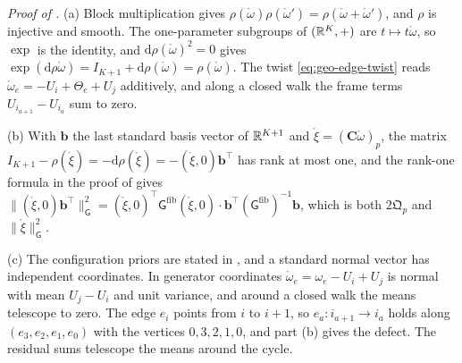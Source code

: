 \noindent\emph{Proof of .}
(a) Block multiplication gives $\rho(\mathring\omega)\rho(\mathring\omega')=\rho(\mathring\omega+\mathring\omega')$,
and $\rho$ is injective and smooth. The one-parameter subgroups of $(\mathbb R^K,+)$ are
$t\mapsto t\mathring\omega$, so $\exp$ is the identity, and $\mathrm d\rho(\mathring\omega)^2=0$ gives
$\exp(\mathrm d\rho\mathring\omega)=I_{K+1}+\mathrm d\rho(\mathring\omega)=\rho(\mathring\omega)$. The
twist \cref{eq:geo-edge-twist} reads $\mathring\omega_e=-U_i+\Theta_e+U_j$ additively, and along a closed
walk the frame terms $U_{i_{a+1}}-U_{i_a}$ sum to zero.

(b) With $\mathbf b$ the last standard basis vector of $\mathbb R^{K+1}$ and $\mathring\xi=(\mathbf C\mathring\omega)_p$, the
matrix $I_{K+1}-\rho(\mathring\xi)=-\mathrm d\rho(\mathring\xi)=-(\mathring\xi,0)\mathbf b^\top$ has rank at most one, and the rank-one
formula in the proof of  gives
$\lVert(\mathring\xi,0)\mathbf b^\top\rVert^2_{\mathsf G}=(\mathring\xi,0)^\top\mathsf G^{\mathrm{fib}}(\mathring\xi,0)\cdot\mathbf b^\top(\mathsf G^{\mathrm{fib}})^{-1}\mathbf b$,
which is both $2\mathfrak Q_p$ and $\lVert\mathring\xi\rVert^2_{\mathsf G}$.

(c) The configuration priors are stated in ,
and a standard normal vector has independent coordinates. In generator coordinates
$\mathring\omega_e=\omega_e-U_i+U_j$ is normal with mean $U_j-U_i$ and unit variance, and around a closed
walk the means telescope to zero. The edge $e_i$ points from $i$ to $i+1$, so $e_a:i_{a+1}\to i_a$ holds
along $(e_3,e_2,e_1,e_0)$ with the vertices $0,3,2,1,0$, and part (b) gives the defect. The residual sums
telescope the means around the cycle.

